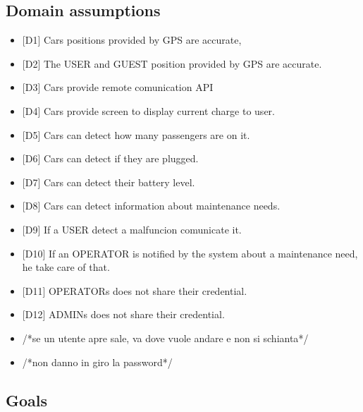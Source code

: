 \subsection{Domain assumptions}
\begin{itemize}
\item {[}D1{]} Cars positions provided by GPS are accurate,
\item {[}D2{]} The USER and GUEST position provided by GPS are accurate.
\item {[}D3{]} Cars provide remote comunication API
\item {[}D4{]} Cars provide screen to display current charge to user.
\item {[}D5{]} Cars can detect how many passengers are on it.
\item {[}D6{]} Cars can detect if they are plugged.
\item {[}D7{]} Cars can detect their battery level.
\item {[}D8{]} Cars can detect information about maintenance needs.
\item {[}D9{]} If a USER detect a malfuncion comunicate it.
\item {[}D10{]} If an OPERATOR is notified by the system about a maintenance
need, he take care of that.
\item {[}D11{]} OPERATORs does not share their credential.
\item {[}D12{]} ADMINs does not share their credential.
\item /{*}se un utente apre sale, va dove vuole andare e non si schianta{*}/
\item /{*}non danno in giro la password{*}/
\end{itemize}

\subsection{Goals}

